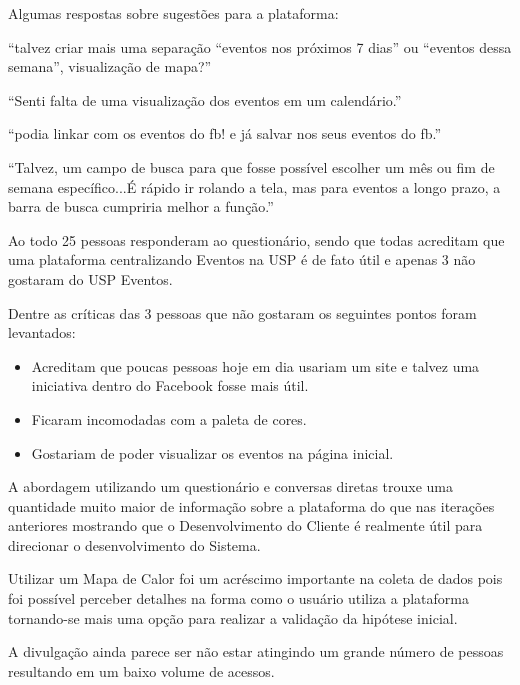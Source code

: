 \par Algumas respostas sobre sugestões para a plataforma:
\par ``talvez criar mais uma separação ``eventos nos próximos 7 dias'' ou ``eventos dessa semana'', visualização de mapa?''\\
\par ``Senti falta de uma visualização dos eventos em um calendário.''\\
\par ``podia linkar com os eventos do fb! e já salvar nos seus eventos do fb.''\\
\par ``Talvez, um campo de busca para que fosse possível escolher um mês ou fim de semana específico...É rápido ir rolando a tela, mas para eventos a longo prazo, a barra de busca cumpriria melhor a função.''\\

\par Ao todo 25 pessoas responderam ao questionário, sendo que todas acreditam que uma plataforma centralizando Eventos na USP é de fato útil e  apenas 3 não gostaram do USP Eventos.
\par Dentre as críticas das 3 pessoas que não gostaram os seguintes pontos foram levantados:
\begin{itemize}
\item Acreditam que poucas pessoas hoje em dia usariam um site e talvez uma iniciativa dentro do Facebook fosse mais útil.
\item Ficaram incomodadas com a paleta de cores.
\item Gostariam de poder visualizar os eventos na página inicial.
\end{itemize}

\par A abordagem utilizando um questionário e conversas diretas trouxe uma quantidade muito maior de informação sobre a plataforma do que nas iterações anteriores mostrando que o Desenvolvimento do Cliente é realmente útil para direcionar o desenvolvimento do Sistema.
\par Utilizar um Mapa de Calor foi um acréscimo importante na coleta de dados pois foi possível perceber detalhes na forma como o usuário utiliza a plataforma tornando-se mais uma opção para realizar a validação da hipótese inicial.
\par A divulgação ainda parece ser não estar atingindo um grande número de pessoas resultando em um baixo volume de acessos.
